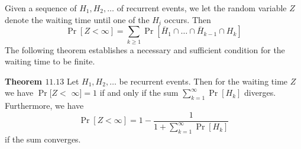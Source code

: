 Given a sequence of $H_{1}, H_{2}, \ldots$ of recurrent events, we let the random variable $Z$ denote the waiting time until one of the $H_{i}$ occurs. Then
$$
\operatorname{Pr}[Z<\infty]=\sum_{k \geq 1} \operatorname{Pr}\left[\bar{H}_{1} \cap \ldots \cap \bar{H}_{k-1} \cap H_{k}\right]
$$
The following theorem establishes a necessary and sufficient condition for the waiting time to be finite.

\textbf{Theorem $11.13$} Let $H_{1}, H_{2}, \ldots$ be recurrent events. Then for the waiting time $Z$ we have $\operatorname{Pr}[Z<$ $\infty]=1$ if and only if the sum $\sum_{k=1}^{\infty} \operatorname{Pr}\left[H_{k}\right]$ diverges. Furthermore, we have
$$
\operatorname{Pr}[Z<\infty]=1-\frac{1}{1+\sum_{k=1}^{\infty} \operatorname{Pr}\left[H_{k}\right]}
$$
if the sum converges.